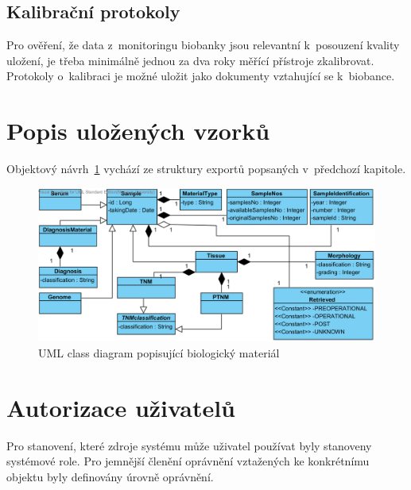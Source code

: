 \documentclass[11pt, draft, oneside]{fithesis2}
\begin{document}
\subsection{Kalibrační protokoly}
Pro ověření, že data z~monitoringu biobanky jsou relevantní k~posouzení kvality uložení, je třeba minimálně jednou za dva roky měřící přístroje zkalibrovat. Protokoly o~kalibraci je možné uložit jako dokumenty vztahující se k~biobance.


\section{Popis uložených vzorků}
Objektový návrh~\ref{fig:index:uml:class:sample} vychází ze struktury exportů popsaných v~předchozí kapitole.

\begin{figure}[h!]
\begin{center}
	\includegraphics[width=\textwidth]{SampleView}
\caption{UML class diagram popisující biologický materiál}
\label{fig:index:uml:class:sample}
\end{center}
\end{figure}


\section{Autorizace uživatelů}
Pro stanovení, které zdroje systému může uživatel používat byly stanoveny systémové role. Pro jemnější členění oprávnění vztažených ke konkrétnímu objektu byly definovány úrovně oprávnění.
\end{document}
